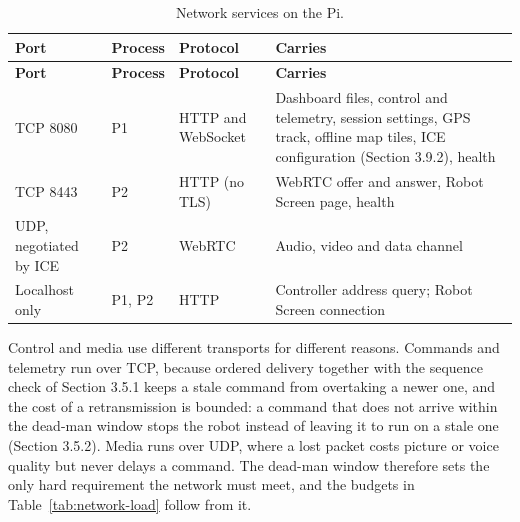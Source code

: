 \begin{center}
\begin{longtable}{|l|l|l|p{6cm}|}
\caption{Network services on the Pi.}
\label{tab:network-services} \\
\hline
\textbf{Port} & \textbf{Process} & \textbf{Protocol} & \textbf{Carries} \\
\hline
\endfirsthead
\hline
\textbf{Port} & \textbf{Process} & \textbf{Protocol} & \textbf{Carries} \\
\hline
\endhead
TCP 8080 & P1 & HTTP and WebSocket & Dashboard files, control and telemetry, session settings, GPS track, offline map tiles, ICE configuration (Section 3.9.2), health \\
\hline
TCP 8443 & P2 & HTTP (no TLS) & WebRTC offer and answer, Robot Screen page, health \\
\hline
UDP, negotiated by ICE & P2 & WebRTC & Audio, video and data channel \\
\hline
Localhost only & P1, P2 & HTTP & Controller address query; Robot Screen connection \\
\hline
\end{longtable}
\end{center}

Control and media use different transports for different reasons. Commands and telemetry run over TCP, because ordered delivery together with the sequence check of Section 3.5.1 keeps a stale command from overtaking a newer one, and the cost of a retransmission is bounded: a command that does not arrive within the dead-man window stops the robot instead of leaving it to run on a stale one (Section 3.5.2). Media runs over UDP, where a lost packet costs picture or voice quality but never delays a command. The dead-man window therefore sets the only hard requirement the network must meet, and the budgets in Table~\ref{tab:network-load} follow from it.

